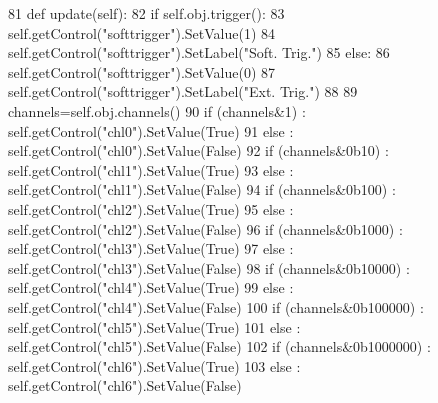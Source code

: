 \begin{DoxyCode}
81     \textcolor{keyword}{def }update(self):
82         \textcolor{keywordflow}{if} self.obj.trigger():
83             self.getControl(\textcolor{stringliteral}{"softtrigger"}).SetValue(1)
84             self.getControl(\textcolor{stringliteral}{"softtrigger"}).SetLabel(\textcolor{stringliteral}{"Soft. Trig."})
85         \textcolor{keywordflow}{else}:
86             self.getControl(\textcolor{stringliteral}{"softtrigger"}).SetValue(0)
87             self.getControl(\textcolor{stringliteral}{"softtrigger"}).SetLabel(\textcolor{stringliteral}{"Ext. Trig."})
88 
89         channels=self.obj.channels()
90         \textcolor{keywordflow}{if} (channels&1) : self.getControl(\textcolor{stringliteral}{"chl0"}).SetValue(\textcolor{keyword}{True})
91         \textcolor{keywordflow}{else} : self.getControl(\textcolor{stringliteral}{"chl0"}).SetValue(\textcolor{keyword}{False})
92         \textcolor{keywordflow}{if} (channels&0b10) : self.getControl(\textcolor{stringliteral}{"chl1"}).SetValue(\textcolor{keyword}{True})
93         \textcolor{keywordflow}{else} : self.getControl(\textcolor{stringliteral}{"chl1"}).SetValue(\textcolor{keyword}{False})
94         \textcolor{keywordflow}{if} (channels&0b100) : self.getControl(\textcolor{stringliteral}{"chl2"}).SetValue(\textcolor{keyword}{True})
95         \textcolor{keywordflow}{else} : self.getControl(\textcolor{stringliteral}{"chl2"}).SetValue(\textcolor{keyword}{False})
96         \textcolor{keywordflow}{if} (channels&0b1000) : self.getControl(\textcolor{stringliteral}{"chl3"}).SetValue(\textcolor{keyword}{True})
97         \textcolor{keywordflow}{else} : self.getControl(\textcolor{stringliteral}{"chl3"}).SetValue(\textcolor{keyword}{False})
98         \textcolor{keywordflow}{if} (channels&0b10000) : self.getControl(\textcolor{stringliteral}{"chl4"}).SetValue(\textcolor{keyword}{True})
99         \textcolor{keywordflow}{else} : self.getControl(\textcolor{stringliteral}{"chl4"}).SetValue(\textcolor{keyword}{False})
100         \textcolor{keywordflow}{if} (channels&0b100000) : self.getControl(\textcolor{stringliteral}{"chl5"}).SetValue(\textcolor{keyword}{True})
101         \textcolor{keywordflow}{else} : self.getControl(\textcolor{stringliteral}{"chl5"}).SetValue(\textcolor{keyword}{False})
102         \textcolor{keywordflow}{if} (channels&0b1000000) : self.getControl(\textcolor{stringliteral}{"chl6"}).SetValue(\textcolor{keyword}{True})
103         \textcolor{keywordflow}{else} : self.getControl(\textcolor{stringliteral}{"chl6"}).SetValue(\textcolor{keyword}{False})

\end{DoxyCode}
